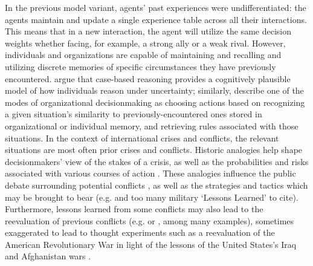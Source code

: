 In the previous model variant, agents' past experiences were undifferentiated: the agents maintain and update a single experience table across all their interactions. This means that in a new interaction, the agent will utilize the same decision weights whether facing, for example, a strong ally or a weak rival. However, individuals and organizations are capable of maintaining and recalling and utilizing discrete memories of specific circumstances they have previously encountered. \citet{gilboa_1995} argue that case-based reasoning provides a cognitively plausible model of how individuals reason under uncertainty; similarly, \citet{march_1993} describe one of the modes of organizational decisionmaking as choosing actions based on recognizing a given situation's similarity to previously-encountered ones stored in organizational or individual memory, and retrieving rules associated with those situations. In the context of international crises and conflicts, the relevant situations are most often prior crises and conflicts. Historic analogies help shape decisionmakers' view of the stakes of a crisis, as well as the probabilities and risks associated with various courses of action \citep{khong_1992}. These analogies influence the public debate surrounding potential conflicts \citep{schuman_1992,noon_2004,schuman_2006}, as well as the strategies and tactics which may be brought to bear (e.g. \citealt{nagl_2002} and too many military `Lessons Learned' to cite). Furthermore, lessons learned from some conflicts may also lead to the reevaluation of previous conflicts (e.g. \citealt{hagerman_1992} or \citealt{forster_2002}, among many examples), sometimes exaggerated to lead to thought experiments such as a reevaluation of the American Revolutionary War in light of the lessons of the United States's Iraq and Afghanistan wars \citep{exum_2008}.

